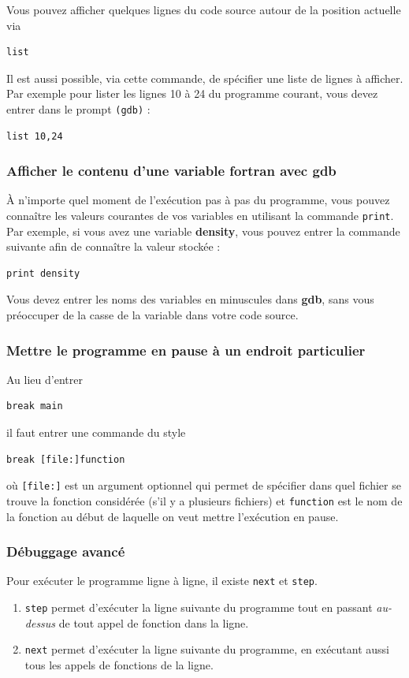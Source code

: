 \documentclass[a4paper,twoside]{article}
\begin{document}
\bigskip

Vous pouvez afficher quelques lignes du code source autour de la position actuelle via 
\begin{verbatim}
list
\end{verbatim}

Il est aussi possible, via cette commande, de spécifier une liste de lignes à afficher. Par exemple pour lister les lignes 10 à 24 du programme courant, vous devez entrer dans le prompt \texttt{(gdb)} :
\begin{verbatim}
list 10,24
\end{verbatim}

\subsubsection{Afficher le contenu d'une variable fortran avec gdb}
À n'importe quel moment de l'exécution pas à pas du programme, vous pouvez connaître les valeurs courantes de vos variables en utilisant la commande \texttt{print}. Par exemple, si vous avez une variable \textbf{density}, vous pouvez entrer la commande suivante afin de connaître la valeur stockée : 
\begin{verbatim}
print density
\end{verbatim}
 
\begin{attention}
Vous devez entrer les noms des variables en minuscules dans \textbf{gdb}, sans vous préoccuper de la casse de la variable dans votre code source.
\end{attention}

\subsubsection{Mettre le programme en pause à un endroit particulier}
Au lieu d'entrer 
\begin{verbatim}
break main
\end{verbatim}
il faut entrer une commande du style
\begin{verbatim}
break [file:]function
\end{verbatim}
où \texttt{[file:]} est un argument optionnel qui permet de spécifier dans quel fichier se trouve la fonction considérée (s'il y a plusieurs fichiers) et \texttt{function} est le nom de la fonction au début de laquelle on veut mettre l'exécution en pause.

\subsubsection{Débuggage avancé}
Pour exécuter le programme ligne à ligne, il existe \texttt{next} et \texttt{step}. 
\begin{enumerate}
\item \texttt{step} permet d'exécuter la ligne suivante du programme tout en passant \emph{au-dessus} de tout appel de fonction dans la ligne.
\item \texttt{next} permet d'exécuter la ligne suivante du programme, en exécutant aussi tous les appels de fonctions de la ligne.
\end{enumerate}
\end{document}
